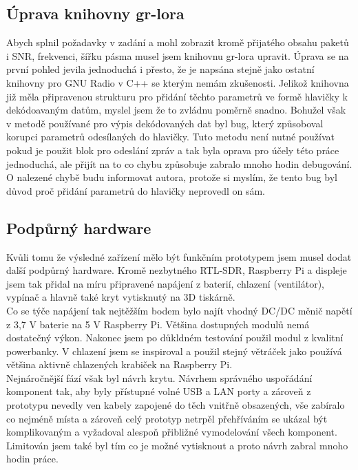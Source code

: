 \documentclass{ctuthesis}
\begin{document}
\subsection{Úprava knihovny gr-lora} \label{loraedit}
Abych splnil požadavky v zadání a mohl zobrazit kromě přijatého obsahu paketů i SNR, frekvenci, šířku pásma musel jsem knihovnu gr-lora upravit. Úprava se na první pohled jevila jednoduchá i přesto, že je napsána stejně jako ostatní knihovny pro GNU Radio v C++ se kterým nemám zkušenosti. Jelikož knihovna již měla připravenou strukturu pro přidání těchto parametrů ve formě hlavičky k dekódoavaným datům, myslel jsem že to zvládnu poměrně snadno. Bohužel však v metodě používané pro výpis dekódovaných dat byl bug, který způsoboval korupci parametrů odesílaných do hlavičky. Tuto metodu není nutné používat pokud je použit blok pro odeslání zpráv a tak byla oprava pro účely této práce jednoduchá, ale přijít na to co chybu způsobuje zabralo mnoho hodin debugování. O nalezené chybě budu informovat autora, protože si myslím, že tento bug byl důvod proč přidání parametrů do hlavičky neprovedl on sám.

\subsection{Podpůrný hardware}
Kvůli tomu že výsledné zařízení mělo být funkčním prototypem jsem musel dodat další podpůrný hardware. Kromě nezbytného RTL-SDR, Raspberry Pi a displeje jsem tak přidal na míru připravené napájení z baterií, chlazení (ventilátor), vypínač a hlavně také kryt vytisknutý na 3D tiskárně.\\
Co se týče napájení tak nejtěžším bodem bylo najít vhodný DC/DC měnič napětí z 3,7 V baterie na 5 V Raspberry Pi. Většina dostupných modulů nemá dostatečný výkon. Nakonec jsem po důkldném testování použil modul z kvalitní powerbanky. V chlazení jsem se inspiroval a použil stejný větráček jako používá většina aktivně chlazených krabiček na Raspberry Pi.\\
Nejnáročnější fází však byl návrh krytu. Návrhem správného uspořádání komponent tak, aby byly přístupné volné USB a LAN porty a zároveň z prototypu nevedly ven kabely zapojené do těch vnitřně obsazených, vše zabíralo co nejméně místa a zároveň celý prototyp netrpěl přehříváním se ukázal být komplikovaným a vyžadoval alespoň přibližné vymodelování všech komponent. Limitován jsem také byl tím co je možné vytisknout a proto návrh zabral mnoho hodin práce.
\end{document}
